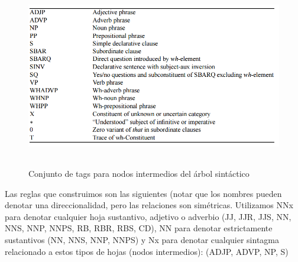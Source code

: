 \begin{figure}[H]
  \centering
    \includegraphics[width=12.823cm,height=8.004cm]{graficos/fuentes/SyntaxTags.png}
  \caption{Conjunto de tags para nodos intermedios del árbol sintáctico}
  \label{fig:syntax-tags}
\end{figure}


Las reglas que construimos son las siguientes (notar que los nombres pueden denotar una direccionalidad, pero las relaciones son simétricas.
Utilizamos NNx para denotar cualquier hoja sustantivo, adjetivo o adverbio (JJ, JJR, JJS, NN, NNS, NNP, NNPS, RB, RBR, RBS, CD), NN para denotar estrictamente sustantivos (NN, NNS, NNP, NNPS) y Nx para denotar cualquier sintagma relacionado a estos tipos de hojas (nodos intermedios): (ADJP, ADVP, NP, S)

